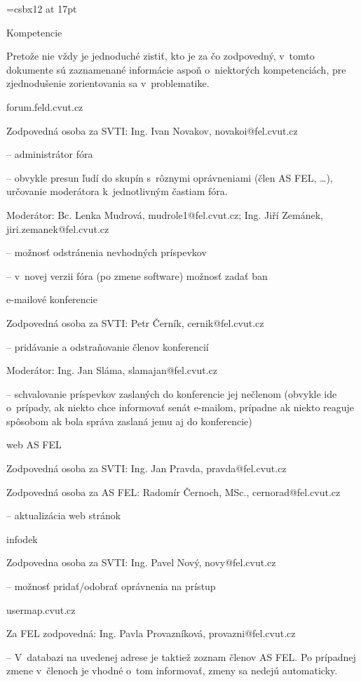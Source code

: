 \font\nadpis=csbx12 at 17pt


\centerline{{\nadpis Kompetencie}}

Pretože nie vždy je jednoduché zistiť, kto je za čo zodpovedný, v~tomto
dokumente sú zaznamenané informácie aspoň o~niektorých kompetenciách,
pre zjednodušenie zorientovania sa v~problematike.

\beginsection forum.feld.cvut.cz

Zodpovedná osoba za SVTI: Ing. Ivan Novakov, novakoi@fel.cvut.cz
  \item{--} administrátor fóra
  \item{--} obvykle presun ľudí do skupín s~rôznymi oprávneniami (člen
	AS FEL, \dots), určovanie moderátora k~jednotlivným častiam fóra.

\noindent Moderátor: Bc. Lenka Mudrová, mudrole1@fel.cvut.cz; Ing. Jiří Zemánek,
jiri.zemanek@fel.cvut.cz
 \item{--} možnosť odstránenia nevhodných príspevkov
 \item{--} v~novej verzii fóra (po zmene software) možnosť zadať ban


\beginsection e-mailové konferencie

Zodpovedná osoba za SVTI: Petr Černík, cernik@fel.cvut.cz
  \item{--} pridávanie a odstraňovanie členov konferencií

\noindent Moderátor: Ing. Jan Sláma, slamajan@fel.cvut.cz
  \item{--} schvalovanie príspevkov zaslaných do konferencie jej
	nečlenom (obvykle ide o~prípady, ak niekto chce informovať senát
	e-mailom, prípadne ak niekto reaguje spôsobom 
	ak bola správa zaslaná jemu aj do konferencie)


\beginsection web AS FEL

Zodpovedná osoba za SVTI: Ing. Jan Pravda, pravda@fel.cvut.cz

\noindent Zodpovedná osoba za AS FEL: Radomír Černoch, MSc., cernorad@fel.cvut.cz
  \item{--} aktualizácia web stránok


\beginsection infodek

Zodpovedna osoba za SVTI: Ing. Pavel Nový, novy@fel.cvut.cz
  \item{--} možnosť pridať/odobrať oprávnenia na prístup


\beginsection usermap.cvut.cz

Za FEL zodpovedná: Ing. Pavla Provazníková, provazni@fel.cvut.cz
  \item{--} V~databazi na uvedenej adrese je taktiež zoznam členov AS FEL. Po prípadnej zmene v~členoch je
    vhodné o~tom informovať, zmeny sa nedejú automaticky.

\medskip
{}

\bye
